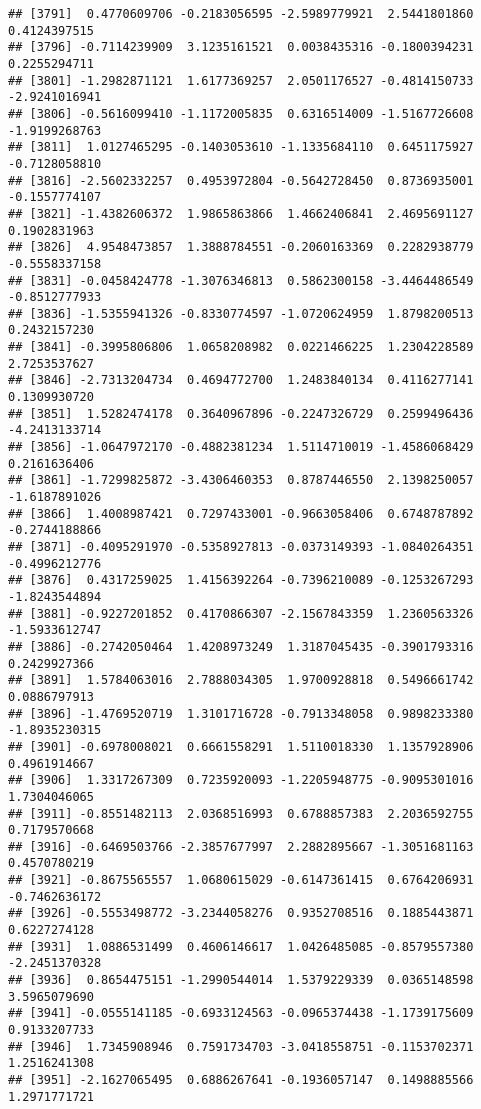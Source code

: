 \documentclass[
]{article}
\begin{document}
\begin{verbatim}
## [3791]  0.4770609706 -0.2183056595 -2.5989779921  2.5441801860  0.4124397515
## [3796] -0.7114239909  3.1235161521  0.0038435316 -0.1800394231  0.2255294711
## [3801] -1.2982871121  1.6177369257  2.0501176527 -0.4814150733 -2.9241016941
## [3806] -0.5616099410 -1.1172005835  0.6316514009 -1.5167726608 -1.9199268763
## [3811]  1.0127465295 -0.1403053610 -1.1335684110  0.6451175927 -0.7128058810
## [3816] -2.5602332257  0.4953972804 -0.5642728450  0.8736935001 -0.1557774107
## [3821] -1.4382606372  1.9865863866  1.4662406841  2.4695691127  0.1902831963
## [3826]  4.9548473857  1.3888784551 -0.2060163369  0.2282938779 -0.5558337158
## [3831] -0.0458424778 -1.3076346813  0.5862300158 -3.4464486549 -0.8512777933
## [3836] -1.5355941326 -0.8330774597 -1.0720624959  1.8798200513  0.2432157230
## [3841] -0.3995806806  1.0658208982  0.0221466225  1.2304228589  2.7253537627
## [3846] -2.7313204734  0.4694772700  1.2483840134  0.4116277141  0.1309930720
## [3851]  1.5282474178  0.3640967896 -0.2247326729  0.2599496436 -4.2413133714
## [3856] -1.0647972170 -0.4882381234  1.5114710019 -1.4586068429  0.2161636406
## [3861] -1.7299825872 -3.4306460353  0.8787446550  2.1398250057 -1.6187891026
## [3866]  1.4008987421  0.7297433001 -0.9663058406  0.6748787892 -0.2744188866
## [3871] -0.4095291970 -0.5358927813 -0.0373149393 -1.0840264351 -0.4996212776
## [3876]  0.4317259025  1.4156392264 -0.7396210089 -0.1253267293 -1.8243544894
## [3881] -0.9227201852  0.4170866307 -2.1567843359  1.2360563326 -1.5933612747
## [3886] -0.2742050464  1.4208973249  1.3187045435 -0.3901793316  0.2429927366
## [3891]  1.5784063016  2.7888034305  1.9700928818  0.5496661742  0.0886797913
## [3896] -1.4769520719  1.3101716728 -0.7913348058  0.9898233380 -1.8935230315
## [3901] -0.6978008021  0.6661558291  1.5110018330  1.1357928906  0.4961914667
## [3906]  1.3317267309  0.7235920093 -1.2205948775 -0.9095301016  1.7304046065
## [3911] -0.8551482113  2.0368516993  0.6788857383  2.2036592755  0.7179570668
## [3916] -0.6469503766 -2.3857677997  2.2882895667 -1.3051681163  0.4570780219
## [3921] -0.8675565557  1.0680615029 -0.6147361415  0.6764206931 -0.7462636172
## [3926] -0.5553498772 -3.2344058276  0.9352708516  0.1885443871  0.6227274128
## [3931]  1.0886531499  0.4606146617  1.0426485085 -0.8579557380 -2.2451370328
## [3936]  0.8654475151 -1.2990544014  1.5379229339  0.0365148598  3.5965079690
## [3941] -0.0555141185 -0.6933124563 -0.0965374438 -1.1739175609  0.9133207733
## [3946]  1.7345908946  0.7591734703 -3.0418558751 -0.1153702371  1.2516241308
## [3951] -2.1627065495  0.6886267641 -0.1936057147  0.1498885566  1.2971771721

\end{verbatim}
\end{document}
